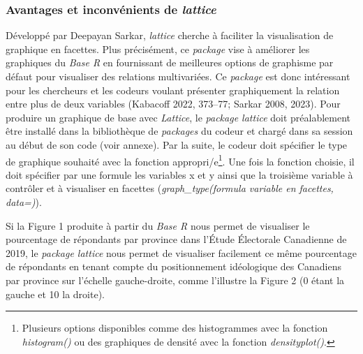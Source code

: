 \documentclass[
  letterpaper,
  DIV=11,
  numbers=noendperiod]{scrreprt}
\begin{document}
\hypertarget{avantages-et-inconvuxe9nients-de-lattice}{%
\subsubsection{\texorpdfstring{Avantages et inconvénients de
\emph{lattice}}{Avantages et inconvénients de lattice}}\label{avantages-et-inconvuxe9nients-de-lattice}}

Développé par Deepayan Sarkar, \emph{lattice} cherche à faciliter la
visualisation de graphique en facettes. Plus précisément, ce
\emph{package} vise à améliorer les graphiques du \emph{Base R} en
fournissant de meilleures options de graphisme par défaut pour
visualiser des relations multivariées. Ce \emph{package} est donc
intéressant pour les chercheurs et les codeurs voulant présenter
graphiquement la relation entre plus de deux variables (Kabacoff 2022,
373--77; Sarkar 2008, 2023). Pour produire un graphique de base avec
\emph{Lattice}, le \emph{package lattice} doit préalablement être
installé dans la bibliothèque de \emph{packages} du codeur et chargé
dans sa session au début de son code (voir annexe). Par la suite, le
codeur doit spécifier le type de graphique souhaité avec la fonction
appropri/e\footnote{Plusieurs options disponibles comme des histogrammes
  avec la fonction \emph{histogram()} ou des graphiques de densité avec
  la fonction \emph{densityplot()}.}. Une fois la fonction choisie, il
doit spécifier par une formule les variables x et y ainsi que la
troisième variable à contrôler et à visualiser en facettes
(\emph{graph\_type(formula \textbar{} variable en facettes, data=)}).

Si la Figure 1 produite à partir du \emph{Base R} nous permet de
visualiser le pourcentage de répondants par province dans l'Étude
Électorale Canadienne de 2019, le \emph{package lattice} nous permet de
visualiser facilement ce même pourcentage de répondants en tenant compte
du positionnement idéologique des Canadiens par province sur l'échelle
gauche-droite, comme l'illustre la Figure 2 (0 étant la gauche et 10 la
droite).
\end{document}
